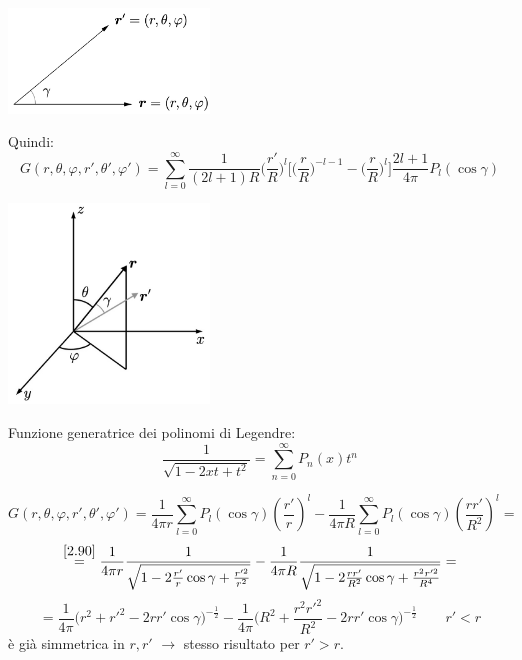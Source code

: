 \documentclass[a4paper,11pt]{report}
\begin{document}
\begin{center}
\includegraphics[width=0.4\textwidth]{immagini/vettori}
\end{center}

Quindi:
\[
G(r,\theta,\varphi,r',\theta',\varphi')=\sum_{l=0}^{\infty}\frac{1}{(2l+1)R} \Big(\frac{r'}{R}\Big)^l \Big[ \Big(\frac{r}{R}\Big)^{-l-1} - \Big(\frac{r}{R}\Big)^l\Big]\frac{2l+1}{4\pi}P_l(\cos\gamma)
\]

\begin{center}
\includegraphics[width=0.4\textwidth]{immagini/vettori2-var}
\end{center}

Funzione generatrice dei polinomi di Legendre:
\begin{equation}
\frac{1}{\sqrt{1-2xt + t^2}} = \sum_{n=0}^{\infty} P_n(x)t^n
\label{2.90}
\end{equation}

\[
G(r,\theta,\varphi,r',\theta',\varphi')=\frac{1}{4\pi r} \sum_{l=0}^\infty P_l(\cos \gamma)\left(\frac{r'}{r}\right)^l - \frac{1}{4\pi R}\sum_{l=0}^\infty P_l(\cos\gamma)\left(\frac{rr'}{R^2}\right)^l=
\]
\[
\overset{\eqref{2.90}}{=}\frac{1}{4\pi r}\frac{1}{\sqrt{1-2\frac{r'}{r}\cos\gamma + \frac{r'^2}{r^2}}} - \frac{1}{4\pi R}\frac{1}{\sqrt{1-2\frac{rr'}{R^2}\cos\gamma + \frac{r^2r'^2}{R^4}}}=
\]
\begin{equation}
=\frac{1}{4\pi} \Big(r^2 + r'^2 - 2rr'\cos\gamma\Big)^{-\frac{1}{2}} - \frac{1}{4\pi}\Big(R^2 + \frac{r^2r'^2}{R^2} - 2rr'\cos\gamma\Big)^{-\frac{1}{2}} \qquad r'<r
\label{2.91}
\end{equation}
\`e gi\`a simmetrica in $r,r'$ $\rightarrow$ stesso risultato per $r' >r$.
\end{document}
